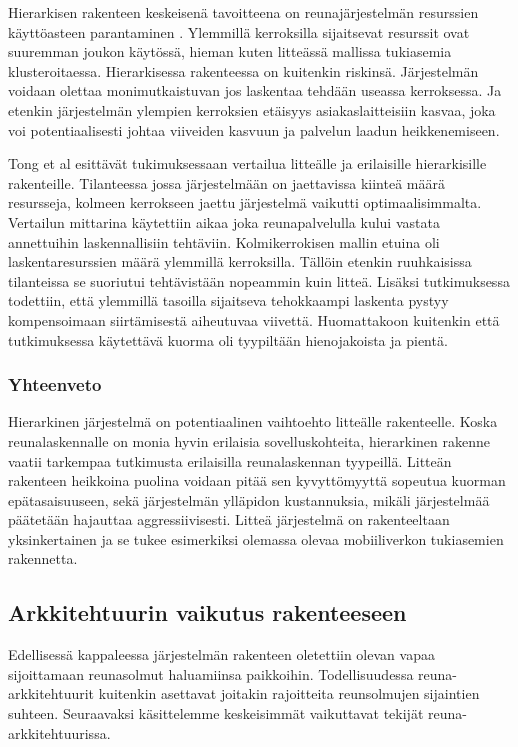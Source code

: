 Hierarkisen rakenteen keskeisenä tavoitteena on reunajärjestelmän resurssien käyttöasteen parantaminen \cite{tong2016hierarchial}. Ylemmillä kerroksilla sijaitsevat resurssit ovat suuremman joukon käytössä, hieman kuten litteässä mallissa tukiasemia klusteroitaessa. 
Hierarkisessa rakenteessa on kuitenkin riskinsä. Järjestelmän voidaan olettaa monimutkaistuvan jos laskentaa tehdään useassa kerroksessa. Ja etenkin järjestelmän ylempien kerroksien etäisyys asiakaslaitteisiin kasvaa, joka voi potentiaalisesti johtaa viiveiden kasvuun ja palvelun laadun heikkenemiseen.

Tong et al \cite{tong2016hierarchical} esittävät tukimuksessaan vertailua litteälle ja erilaisille hierarkisille rakenteille. Tilanteessa jossa järjestelmään on jaettavissa kiinteä määrä resursseja, kolmeen kerrokseen jaettu järjestelmä vaikutti optimaalisimmalta.
Vertailun mittarina käytettiin aikaa joka reunapalvelulla kului vastata annettuihin laskennallisiin tehtäviin. Kolmikerrokisen mallin etuina oli laskentaresurssien määrä ylemmillä kerroksilla. Tällöin etenkin ruuhkaisissa tilanteissa se suoriutui tehtävistään nopeammin kuin litteä. Lisäksi tutkimuksessa todettiin, että ylemmillä tasoilla sijaitseva tehokkaampi laskenta pystyy kompensoimaan siirtämisestä aiheutuvaa viivettä. Huomattakoon kuitenkin että tutkimuksessa käytettävä kuorma oli tyypiltään hienojakoista ja pientä. 


\subsubsection{Yhteenveto}
Hierarkinen järjestelmä on potentiaalinen vaihtoehto litteälle rakenteelle. Koska reunalaskennalle on monia hyvin erilaisia sovelluskohteita, hierarkinen rakenne vaatii tarkempaa tutkimusta erilaisilla reunalaskennan tyypeillä. Litteän rakenteen heikkoina puolina voidaan pitää sen kyvyttömyyttä sopeutua kuorman epätasaisuuseen, sekä järjestelmän ylläpidon kustannuksia, mikäli järjestelmää päätetään hajauttaa aggressiivisesti. Litteä järjestelmä on rakenteeltaan yksinkertainen ja se tukee esimerkiksi olemassa olevaa mobiiliverkon tukiasemien rakennetta. 


\subsection{Arkkitehtuurin vaikutus rakenteeseen}
Edellisessä kappaleessa järjestelmän rakenteen oletettiin olevan vapaa sijoittamaan reunasolmut haluamiinsa paikkoihin. 
Todellisuudessa reuna-arkkitehtuurit kuitenkin asettavat joitakin rajoitteita reunsolmujen sijaintien suhteen. Seuraavaksi käsittelemme keskeisimmät vaikuttavat tekijät reuna-arkkitehtuurissa. 


